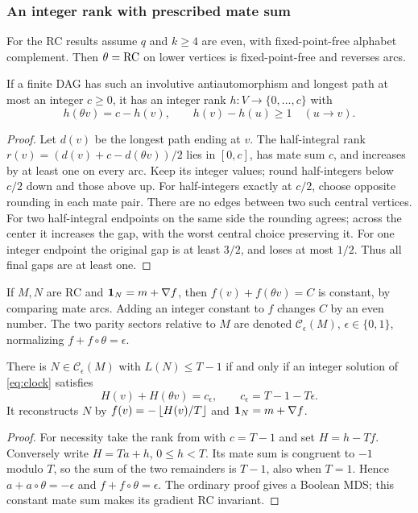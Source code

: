 \subsubsection{An integer rank with prescribed mate sum}
For the RC results assume $q$ and $k\ge4$ are even, with
fixed-point-free alphabet complement. Then $\theta=\operatorname{RC}$ on lower
vertices is fixed-point-free and reverses arcs.

\begin{lemma}\label{lem:autodual-rank}
If a finite DAG has such an involutive antiautomorphism and
longest path at most an integer $c\ge0$, it has an integer rank
$h:V\to\{0,\ldots,c\}$ with
\[
 h(\theta v)=c-h(v),\qquad h(v)-h(u)\ge1\quad(u\to v).
\]
\end{lemma}
\begin{proof}
Let $d(v)$ be the longest path ending at $v$. The half-integral
rank $r(v)=(d(v)+c-d(\theta v))/2$ lies in $[0,c]$, has mate
sum $c$, and increases by at least one on every arc.
Keep its integer values; round half-integers below $c/2$ down
and those above up. For half-integers exactly at $c/2$, choose
opposite rounding in each mate pair. There are no edges between
two such central vertices. For two half-integral endpoints on
the same side the rounding agrees; across the center it
increases the gap, with the worst central choice preserving it.
For one integer endpoint the original gap is at least $3/2$,
and loses at most $1/2$. Thus all final gaps are at least one.
\end{proof}

If $M,N$ are RC and $\mathbf 1_N=m+\nabla f$, then
$f(v)+f(\theta v)=C$ is constant, by comparing mate arcs.
Adding an integer constant to $f$ changes $C$ by an even number.
The two parity sectors relative to $M$ are denoted
$\mathcal C_\epsilon(M)$, $\epsilon\in\{0,1\}$, normalizing
$f+f\circ\theta=\epsilon$.

\begin{theorem}\label{thm:rc-retiming}
There is $N\in\mathcal C_\epsilon(M)$ with $L(N)\le T-1$ if and
only if an integer solution of \eqref{eq:clock} satisfies
\[
 H(v)+H(\theta v)=c_\epsilon,\qquad
 c_\epsilon=T-1-T\epsilon.
 \tag{RC}
\]
It reconstructs $N$ by $f(v)=-\left\lfloor H(v)/T\right\rfloor$ and
$\mathbf 1_N=m+\nabla f$.
\end{theorem}
\begin{proof}
For necessity take the rank from  with
$c=T-1$ and set $H=h-Tf$. Conversely write $H=Ta+h$, $0\le h<T$.
Its mate sum is congruent to $-1$ modulo $T$, so the sum of
the two remainders is $T-1$, also when $T=1$. Hence
$a+a\circ\theta=-\epsilon$ and $f+f\circ\theta=\epsilon$.
The ordinary proof gives a Boolean MDS; this constant mate sum
makes its gradient RC invariant.
\end{proof}

